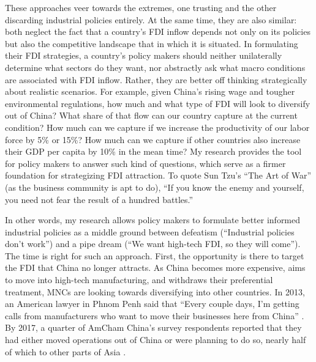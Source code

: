 These approaches veer towards the extremes, one trusting and the other
discarding industrial policies entirely. At the same time, they are also
similar: both neglect the fact that a country's FDI inflow depends not only on
its policies but also the competitive landscape that in which it is situated. In
formulating their FDI strategies, a country's policy makers should neither
unilaterally determine what sectors do they want, nor abstractly ask what macro
conditions are associated with FDI inflow. Rather, they are better off
thinking strategically about realistic scenarios. For example, given China's rising
wage and tougher environmental regulations, how much and what type of FDI will
look to diversify out of China? What share of that flow can our country capture
at the current condition? How much can we capture if we increase the
productivity of our labor force by 5\% or 15\%? How much can we capture if other
countries also increase their GDP per capita by 10\% in the mean time? My
research provides the tool for policy makers to answer such kind of questions,
which serve as a firmer foundation for strategizing FDI attraction. To quote Sun
Tzu's ``The Art of War'' (as the business community is apt to do), ``If you know
the enemy and yourself, you need not fear the result of a hundred battles.''

In other words, my research allows policy makers to formulate better informed
industrial policies as a middle ground between defeatism (``Industrial policies
don't work'') and a pipe dream (``We want high-tech FDI, so they will come'').
The time is right for such an approach. First, the opportunity is there to
target the FDI that China no longer attracts. As China becomes more expensive,
aims to move into high-tech manufacturing, and withdraws their preferential
treatment, MNCs are looking towards diversifying into other countries. In 2013,
an American lawyer in Phnom Penh said that ``Every couple days, I'm getting
calls from manufacturers who want to move their businesses here from China''
\citep{Bradsher2013}. By 2017, a quarter of AmCham China's survey respondents
reported that they had either moved operations out of China or were planning to
do so, nearly half of which to other parts of Asia \citep{AmCham2018}.

